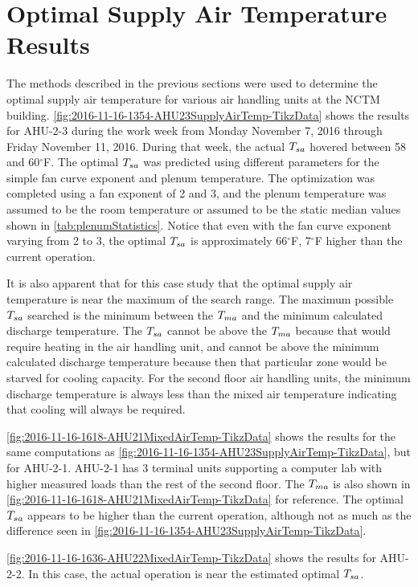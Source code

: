 \section{Optimal Supply Air Temperature Results}

The methods described in the previous sections were used to determine the optimal supply air temperature for various air handling units at the NCTM building. 
\figref{} \ref{fig:2016-11-16-1354-AHU23SupplyAirTemp-TikzData} shows the results for AHU-2-3 during the work week from Monday November 7, 2016 through Friday November 11, 2016. 
During that week, the actual \(T_{sa}\) hovered between 58 and 60\(^\circ\)F. The optimal \(T_{sa}\) was predicted using different parameters for the simple fan curve exponent and plenum temperature. 
The optimization was completed using a fan exponent of 2 and 3, and the plenum temperature was assumed to be the room temperature or assumed to be the static median values shown in \tableref{} \ref{tab:plenumStatistics}. 
Notice that even with the fan curve exponent varying from 2 to 3, the optimal \(T_{sa}\) is approximately 66\(^\circ\)F, 7\(^\circ\)F higher than the current operation. 

It is also apparent that for this case study that the optimal supply air temperature is near the maximum of the search range.
The maximum possible \(T_{sa}\) searched is the minimum between the \(T_{ma}\) and the minimum calculated discharge temperature. The \(T_{sa}\) cannot be above the \(T_{ma}\) because that would require heating in the air handling unit, and cannot be above the minimum calculated discharge temperature because then that particular zone would be starved for cooling capacity.
For the second floor air handling units, the minimum discharge temperature is always less than the mixed air temperature indicating that cooling will always be required.  

\figref{} \ref{fig:2016-11-16-1618-AHU21MixedAirTemp-TikzData} shows the results for the same computations as \figref{} \ref{fig:2016-11-16-1354-AHU23SupplyAirTemp-TikzData}, but for AHU-2-1.
AHU-2-1 has 3 terminal units supporting a computer lab with higher measured loads than the rest of the second floor.
The \(T_{ma}\) is also shown in \figref{} \ref{fig:2016-11-16-1618-AHU21MixedAirTemp-TikzData} for reference. The optimal \(T_{sa}\) appears to be higher than the current operation, although not as much as the difference seen in \figref{ } \ref{fig:2016-11-16-1354-AHU23SupplyAirTemp-TikzData}.


\figref{} \ref{fig:2016-11-16-1636-AHU22MixedAirTemp-TikzData} shows the results for AHU-2-2. 
In this case, the actual operation is near the estimated optimal \(T_{sa}\).

